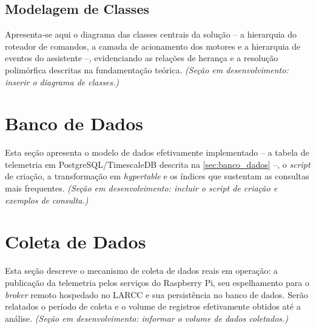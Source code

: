 \subsection{Modelagem de Classes} \label{subsec:modelagem_classes}
Apresenta-se aqui o diagrama das classes centrais da solução -- a hierarquia do roteador de comandos, a camada de acionamento dos motores e a hierarquia de eventos do assistente --, evidenciando as relações de herança e a resolução polimórfica descritas na fundamentação teórica. \textit{(Seção em desenvolvimento: inserir o diagrama de classes.)}

\section{Banco de Dados} \label{sec:dev_banco}
Esta seção apresenta o modelo de dados efetivamente implementado -- a tabela de telemetria em PostgreSQL/TimescaleDB descrita na \autoref{sec:banco_dados} --, o \textit{script} de criação, a transformação em \textit{hypertable} e os índices que sustentam as consultas mais frequentes. \textit{(Seção em desenvolvimento: incluir o script de criação e exemplos de consulta.)}

\section{Coleta de Dados} \label{sec:coleta_dados}
Esta seção descreve o mecanismo de coleta de dados reais em operação: a publicação da telemetria pelos serviços do Raspberry Pi, seu espelhamento para o \textit{broker} remoto hospedado no LARCC e sua persistência no banco de dados. Serão relatados o período de coleta e o volume de registros efetivamente obtidos até a análise. \textit{(Seção em desenvolvimento: informar o volume de dados coletados.)}


